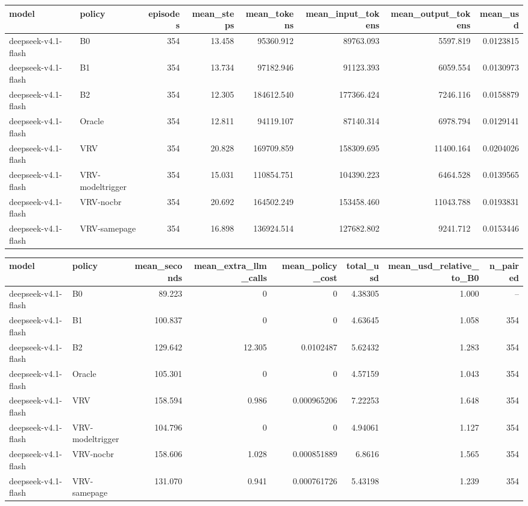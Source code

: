 \begin{tabular}{llrrrrrr}
\toprule
model & policy & episodes & mean\_steps & mean\_tokens & mean\_input\_tokens & mean\_output\_tokens & mean\_usd \\
\midrule
deepseek-v4.1-flash & B0 & 354 & 13.458 & 95360.912 & 89763.093 & 5597.819 & 0.0123815 \\
deepseek-v4.1-flash & B1 & 354 & 13.734 & 97182.946 & 91123.393 & 6059.554 & 0.0130973 \\
deepseek-v4.1-flash & B2 & 354 & 12.305 & 184612.540 & 177366.424 & 7246.116 & 0.0158879 \\
deepseek-v4.1-flash & Oracle & 354 & 12.811 & 94119.107 & 87140.314 & 6978.794 & 0.0129141 \\
deepseek-v4.1-flash & VRV & 354 & 20.828 & 169709.859 & 158309.695 & 11400.164 & 0.0204026 \\
deepseek-v4.1-flash & VRV-modeltrigger & 354 & 15.031 & 110854.751 & 104390.223 & 6464.528 & 0.0139565 \\
deepseek-v4.1-flash & VRV-nocbr & 354 & 20.692 & 164502.249 & 153458.460 & 11043.788 & 0.0193831 \\
deepseek-v4.1-flash & VRV-samepage & 354 & 16.898 & 136924.514 & 127682.802 & 9241.712 & 0.0153446 \\
\bottomrule
\end{tabular}

\begin{tabular}{llrrrrrr}
\toprule
model & policy & mean\_seconds & mean\_extra\_llm\_calls & mean\_policy\_cost & total\_usd & mean\_usd\_relative\_to\_B0 & n\_paired \\
\midrule
deepseek-v4.1-flash & B0 & 89.223 & 0 & 0 & 4.38305 & 1.000 & -- \\
deepseek-v4.1-flash & B1 & 100.837 & 0 & 0 & 4.63645 & 1.058 & 354 \\
deepseek-v4.1-flash & B2 & 129.642 & 12.305 & 0.0102487 & 5.62432 & 1.283 & 354 \\
deepseek-v4.1-flash & Oracle & 105.301 & 0 & 0 & 4.57159 & 1.043 & 354 \\
deepseek-v4.1-flash & VRV & 158.594 & 0.986 & 0.000965206 & 7.22253 & 1.648 & 354 \\
deepseek-v4.1-flash & VRV-modeltrigger & 104.796 & 0 & 0 & 4.94061 & 1.127 & 354 \\
deepseek-v4.1-flash & VRV-nocbr & 158.606 & 1.028 & 0.000851889 & 6.8616 & 1.565 & 354 \\
deepseek-v4.1-flash & VRV-samepage & 131.070 & 0.941 & 0.000761726 & 5.43198 & 1.239 & 354 \\
\bottomrule
\end{tabular}

